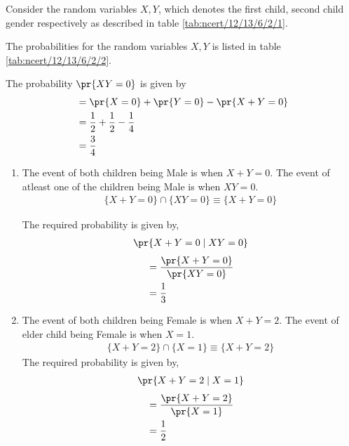 		Consider the random variables $X, Y$, which denotes the first child, second child gender respectively as described in table \ref{tab:ncert/12/13/6/2/1}.
\begin{table}[h]
\centering

\caption{}
\label{tab:ncert/12/13/6/2/1}
\end{table}
%
The probabilities for the random variables $X,Y$ is listed in table \ref{tab:ncert/12/13/6/2/2}.
\begin{table}[h]
\centering

\caption{}
\label{tab:ncert/12/13/6/2/2}
\end{table}
%
The probability $\pr{XY = 0}$ is given by 
\begin{align}
&= \pr{X = 0} + \pr{Y = 0} - \pr{X+Y = 0}\\
&= \frac{1}{2} +\frac{1}{2} - \frac{1}{4}\\
&= \frac{3}{4}
\end{align}
%
\begin{enumerate}
\item  The event of both children being Male is when $X +Y = 0$. The event of atleast one of the children being Male is when $XY = 0$.
\begin{align}
\{X + Y = 0\} \cap \{XY = 0\} \equiv \{X + Y = 0\}
\end{align}

The required probability is given by,
\begin{align}
\pr{X + Y = 0 \mid XY = 0}
\end{align}
\begin{align}
&= \frac{\pr{X + Y = 0}}{\pr{XY = 0}}\\
&= \frac{1}{3}
\end{align}
\item  The event of both children being Female is when $X + Y = 2$. The event of elder child being Female is when $X = 1$.
\begin{align}
\{X + Y = 2\} \cap \{X = 1\} \equiv \{X + Y = 2\}
\end{align}
The required probability is given by,
\begin{align}
\pr{X + Y = 2 \mid X = 1}
\end{align}
\begin{align}
&= \frac{\pr{X + Y = 2}}{\pr{X = 1}}\\
&= \frac{1}{2}
\end{align}
\end{enumerate}


